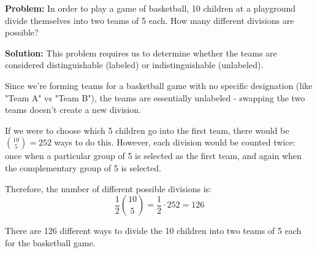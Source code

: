 \begin{examplebox}[title=Example: Basketball Team Division]
    \textbf{Problem:} In order to play a game of basketball, 10 children at a playground divide themselves into two teams of 5 each. How many different divisions are possible?
    
    \textbf{Solution:} This problem requires us to determine whether the teams are considered distinguishable (labeled) or indistinguishable (unlabeled).
    
    Since we're forming teams for a basketball game with no specific designation (like "Team A" vs "Team B"), the teams are essentially unlabeled - swapping the two teams doesn't create a new division.
    
    If we were to choose which 5 children go into the first team, there would be $\binom{10}{5} = 252$ ways to do this. However, each division would be counted twice: once when a particular group of 5 is selected as the first team, and again when the complementary group of 5 is selected.
    
    Therefore, the number of different possible divisions is:
    \[
    \frac{1}{2}\binom{10}{5} = \frac{1}{2} \cdot 252 = 126
    \]
    
    There are 126 different ways to divide the 10 children into two teams of 5 each for the basketball game.
\end{examplebox}

